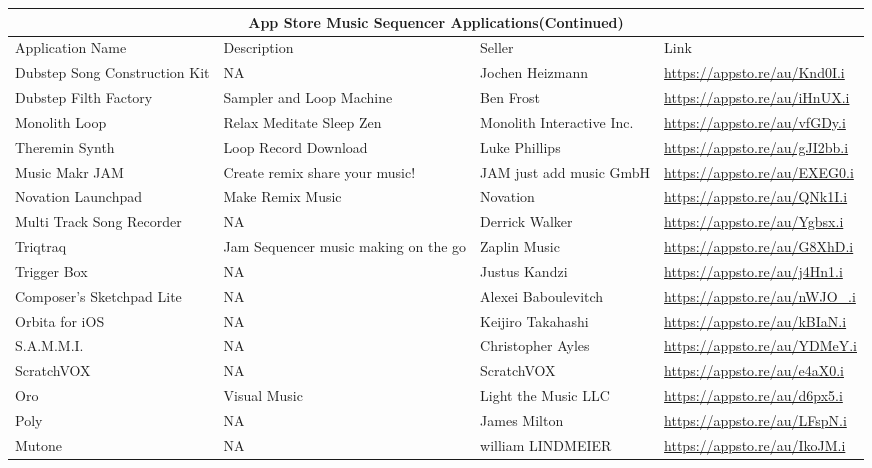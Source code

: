 
 \begin{tabular}{ |p{3cm}||p{3.5cm}|p{3.5cm}|p{3.5cm}||}
  \hline
  \multicolumn{4}{|c|}{App Store Music Sequencer Applications(Continued)} \\
  \hline
  Application Name   & Description  & Seller & Link\\
  \hline

 Dubstep Song Construction Kit &NA & Jochen Heizmann &
  \url{https://appsto.re/au/Knd0I.i}\\

 Dubstep Filth Factory & Sampler and Loop Machine & Ben Frost &
  \url{https://appsto.re/au/iHnUX.i}\\

 Monolith Loop & Relax Meditate Sleep Zen & Monolith Interactive Inc.&
  \url{https://appsto.re/au/vfGDy.i}\\

 Theremin Synth & Loop Record Download & Luke Phillips &
 \url{https://appsto.re/au/gJI2bb.i}\\

 Music Makr JAM & Create remix share your music! & JAM just add music GmbH &
 \url{https://appsto.re/au/EXEG0.i}\\

 Novation Launchpad & Make Remix Music & Novation &
 \url{https://appsto.re/au/QNk1I.i}\\

 Multi Track Song Recorder & NA & Derrick Walker &
 \url{https://appsto.re/au/Ygbsx.i}\\

 Triqtraq & Jam Sequencer music making on the go & Zaplin Music &
 \url{https://appsto.re/au/G8XhD.i}\\

 Trigger Box & NA & Justus Kandzi &
 \url{https://appsto.re/au/j4Hn1.i}\\

 Composer's Sketchpad Lite & NA & Alexei Baboulevitch &
 \url{https://appsto.re/au/nWJO_.i}\\

 Orbita for iOS & NA & Keijiro Takahashi&
 \url{https://appsto.re/au/kBIaN.i}\\

 S.A.M.M.I. & NA & Christopher Ayles &
 \url{https://appsto.re/au/YDMeY.i}\\

 ScratchVOX & NA & ScratchVOX &
 \url{https://appsto.re/au/e4aX0.i}\\

 Oro & Visual Music & Light the Music LLC &
   \url{https://appsto.re/au/d6px5.i}\\

 Poly & NA & James Milton &
   \url{https://appsto.re/au/LFspN.i}\\

 Mutone & NA & william LINDMEIER &
   \url{https://appsto.re/au/IkoJM.i}\\

  \hline
 \end{tabular}

